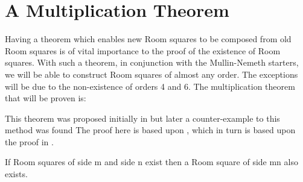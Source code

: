 \section{A Multiplication Theorem}

Having a theorem which enables new Room squares to be composed from old Room squares is of vital importance to the proof of the existence of Room squares.
With such a theorem, in conjunction with the Mullin-Nemeth starters, we will be able to construct Room squares of almost any order.
The exceptions will be due to the non-existence of orders 4 and 6.
The multiplication theorem that will be proven is:

This theorem was proposed initially in
\cite{bruckWhatLoop1963}
but later a counter-example to this method was found
\cite{mullinCounterexampleDirectProduct1969}
The proof here is based upon
\cite{andersonCombinatorialDesignsConstruction1990},
which in turn is based upon the proof in
\cite{stantonMultiplicationTheoremRoom1972a}.

\begin{theorem}
\label{thm:multiply}
If Room squares of side m and side n exist then a Room square of side mn also exists.
\end{theorem}

